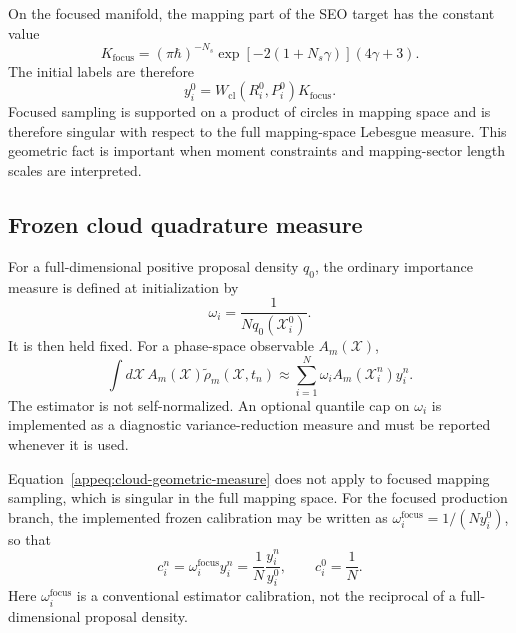 \documentclass[
  11pt,
  letterpaper,
  onehalfspacing,
  normalmargins,
  equalmargins,
  oneside
]{ut-thesis}
\begin{document}
On the focused manifold, the mapping part of the SEO target has the constant
value
\begin{equation}
K_{\mathrm{focus}}
=
(\pi\hbar)^{-N_s}
\exp\left[
-2(1+N_s\gamma)
\right]
(4\gamma+3).
\label{appeq:focused-target-constant}
\end{equation}
The initial labels are therefore
\begin{equation}
y_i^0
=
W_{\mathrm{cl}}(R_i^0,P_i^0)
K_{\mathrm{focus}}.
\label{appeq:focused-initial-label}
\end{equation}
Focused sampling is supported on a product of circles in mapping space and is
therefore singular with respect to the full mapping-space Lebesgue measure.
This geometric fact is important when moment constraints and mapping-sector
length scales are interpreted.

\subsection{Frozen cloud quadrature measure}
\label{appsubsec:cloud-measure}

For a full-dimensional positive proposal density \(q_0\), the ordinary
importance measure is
defined at initialization by
\begin{equation}
\omega_i
=
\frac{
1
}{
Nq_0(\boldsymbol{\mathcal X}_i^0)
}.
\label{appeq:cloud-geometric-measure}
\end{equation}
It is then held fixed.  For a phase-space observable
\(A_m(\boldsymbol{\mathcal X})\),
\begin{equation}
\int
d\boldsymbol{\mathcal X}\,
A_m(\boldsymbol{\mathcal X})
\tilde\rho_m(\boldsymbol{\mathcal X},t_n)
\approx
\sum_{i=1}^{N}
\omega_i
A_m(\boldsymbol{\mathcal X}_i^n)
y_i^n.
\label{appeq:cloud-quadrature}
\end{equation}
The estimator is not self-normalized. An optional quantile cap on
\(\omega_i\) is implemented as a diagnostic variance-reduction measure and
must be reported whenever it is used.

Equation~\eqref{appeq:cloud-geometric-measure} does not apply to focused
mapping sampling, which is singular in the full mapping space. For the
focused production branch, the implemented frozen calibration may be written
as \(\omega_i^{\mathrm{focus}}=1/(Ny_i^0)\), so that
\begin{equation}
c_i^n
=
\omega_i^{\mathrm{focus}}y_i^n
=
\frac{1}{N}\frac{y_i^n}{y_i^0},
\qquad c_i^0=\frac{1}{N}.
\label{appeq:focused-cloud-coefficient}
\end{equation}
Here \(\omega_i^{\mathrm{focus}}\) is a conventional estimator calibration,
not the reciprocal of a full-dimensional proposal density.
\end{document}
